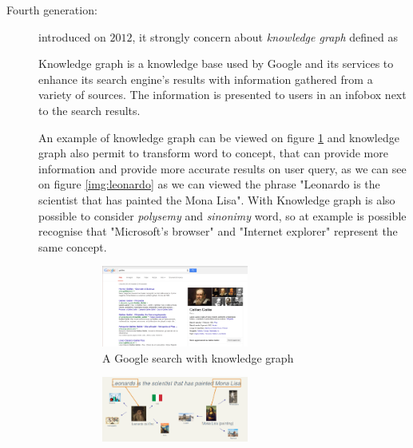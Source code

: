\begin{description}
    \item [Fourth generation: ] introduced on $2012$, it strongly concern about \emph{knowledge graph} defined as
                                \begin{defi}
                                Knowledge graph is a knowledge base used by Google and its services to enhance
                                its search engine's results with information gathered from a variety of sources.\newline
                                The information is presented to users in an infobox next to the search results.
                                \end{defi}
                                An example of knowledge graph can be viewed on figure \ref{img:knowledgeGraph} and
                                knowledge graph also permit to transform word to concept, that can provide more
                                information and provide more accurate results on user query, as we can see on 
                                figure \ref{img:leonardo} as we can viewed the phrase "Leonardo is the scientist
                                that has painted the Mona Lisa". \newline
                                With Knowledge graph is also possible to consider \emph{polysemy} and 
                                \emph{sinonimy} word, so at example is possible recognise that "Microsoft's browser"
                                and "Internet explorer" represent the same concept.
                                \begin{figure}
				    \begin{subfigure}{0.6\textwidth}
					\includegraphics[width=0.6\textwidth]{Images/knowledgeGraph}
                                    	\caption{A Google search with knowledge graph}
                                    	\label{img:knowledgeGraph}
                                    \end{subfigure}
				    \begin{subfigure}{0.6\textwidth}
                                    	\includegraphics[width=0.6\textwidth]{Images/leonardo}

\end{subfigure}
\end{figure}
\end{description}
